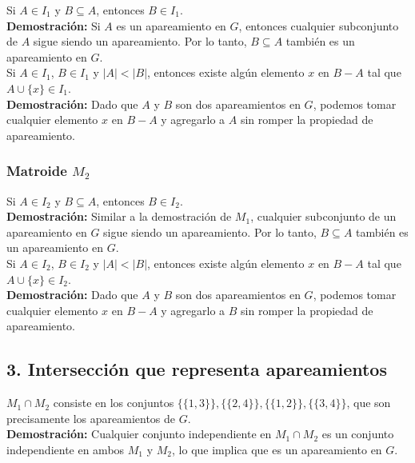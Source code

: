 \documentclass{article}
\begin{document}
Si $A \in I_1$ y $B \subseteq A$, entonces $B \in I_1$.\\

\textbf{Demostración:} Si $A$ es un apareamiento en $G$, entonces cualquier subconjunto de $A$ sigue siendo un apareamiento. Por lo tanto, $B \subseteq A$ también es un apareamiento en $G$.\\

Si $A \in I_1$, $B \in I_1$ y $|A| < |B|$, entonces existe algún elemento $x$ en $B - A$ tal que $A \cup \{x\} \in I_1$.\\

\textbf{Demostración:} Dado que $A$ y $B$ son dos apareamientos en $G$, podemos tomar cualquier elemento $x$ en $B - A$ y agregarlo a $A$ sin romper la propiedad de apareamiento.

\subsubsection*{Matroide $M_2$}

Si $A \in I_2$ y $B \subseteq A$, entonces $B \in I_2$.\\

\textbf{Demostración:} Similar a la demostración de $M_1$, cualquier subconjunto de un apareamiento en $G$ sigue siendo un apareamiento. Por lo tanto, $B \subseteq A$ también es un apareamiento en $G$.\\

Si $A \in I_2$, $B \in I_2$ y $|A| < |B|$, entonces existe algún elemento $x$ en $B - A$ tal que $A \cup \{x\} \in I_2$.\\

\textbf{Demostración:} Dado que $A$ y $B$ son dos apareamientos en $G$, podemos tomar cualquier elemento $x$ en $B - A$ y agregarlo a $B$ sin romper la propiedad de apareamiento.


\subsection*{3. Intersección que representa apareamientos}

$M_1 \cap M_2$ consiste en los conjuntos $\{\{1, 3\}\}, \{\{2, 4\}\}, \{\{1, 2\}\}, \{\{3, 4\}\}$, que son precisamente los apareamientos de $G$.\\

\textbf{Demostración:} Cualquier conjunto independiente en $M_1 \cap M_2$ es un conjunto independiente en ambos $M_1$ y $M_2$, lo que implica que es un apareamiento en $G$.
\end{document}

